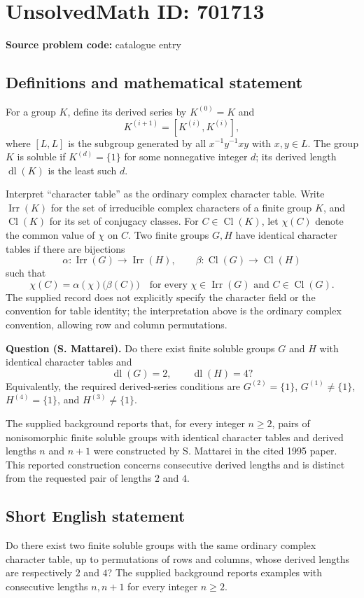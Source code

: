 \documentclass[11pt]{article}
\begin{document}
\section*{UnsolvedMath ID: 701713}
\textbf{Source problem code:} catalogue entry
\subsection{Definitions and mathematical statement}
For a group \(K\), define its derived series by \(K^{(0)}=K\) and
\[
K^{(i+1)}=[K^{(i)},K^{(i)}],
\]
where \([L,L]\) is the subgroup generated by all \(x^{-1}y^{-1}xy\) with \(x,y\in L\). The group \(K\) is soluble if \(K^{(d)}=\{1\}\) for some nonnegative integer \(d\); its derived length \(\operatorname{dl}(K)\) is the least such \(d\).

Interpret ``character table'' as the ordinary complex character table. Write \(\operatorname{Irr}(K)\) for the set of irreducible complex characters of a finite group \(K\), and \(\operatorname{Cl}(K)\) for its set of conjugacy classes. For \(C\in\operatorname{Cl}(K)\), let \(\chi(C)\) denote the common value of \(\chi\) on \(C\). Two finite groups \(G,H\) have identical character tables if there are bijections
\[
\alpha:\operatorname{Irr}(G)\longrightarrow\operatorname{Irr}(H),\qquad
\beta:\operatorname{Cl}(G)\longrightarrow\operatorname{Cl}(H)
\]
such that
\[
\chi(C)=\alpha(\chi)\bigl(\beta(C)\bigr)
\quad\text{for every }\chi\in\operatorname{Irr}(G)\text{ and }C\in\operatorname{Cl}(G).
\]
The supplied record does not explicitly specify the character field or the convention for table identity; the interpretation above is the ordinary complex convention, allowing row and column permutations.

\textbf{Question (S. Mattarei).} Do there exist finite soluble groups \(G\) and \(H\) with identical character tables and
\[
\operatorname{dl}(G)=2,\qquad \operatorname{dl}(H)=4?
\]
Equivalently, the required derived-series conditions are \(G^{(2)}=\{1\}\), \(G^{(1)}\ne\{1\}\), \(H^{(4)}=\{1\}\), and \(H^{(3)}\ne\{1\}\).

The supplied background reports that, for every integer \(n\ge2\), pairs of nonisomorphic finite soluble groups with identical character tables and derived lengths \(n\) and \(n+1\) were constructed by S. Mattarei in the cited 1995 paper. This reported construction concerns consecutive derived lengths and is distinct from the requested pair of lengths \(2\) and \(4\).
\subsection{Short English statement}
Do there exist two finite soluble groups with the same ordinary complex character table, up to permutations of rows and columns, whose derived lengths are respectively \(2\) and \(4\)? The supplied background reports examples with consecutive lengths \(n,n+1\) for every integer \(n\ge2\).
\end{document}
